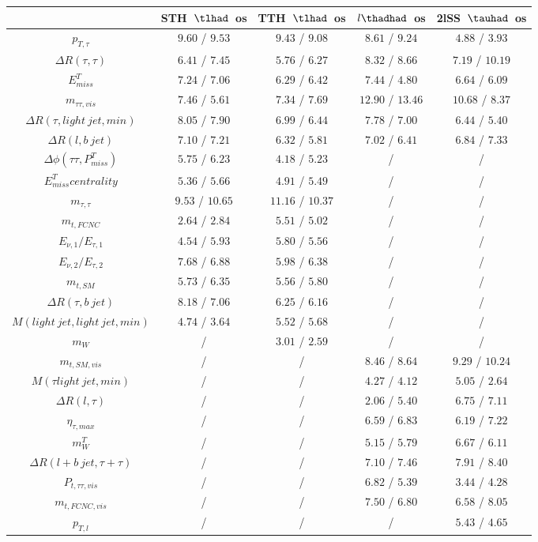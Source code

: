 \centering
\begin{tabular}{|c|c|c|c|c|} \hline
 & STH~$\tlhad$~os & TTH~$\tlhad$~os & $l\thadhad$~os & 2lSS~$\tauhad$~os\\\hline
$p_{T,\tau }$ & $9.60$ / $9.53$ & $9.43$ / $9.08$ & $8.61$ / $9.24$ & $4.88$ / $3.93$\\\hline
$\Delta R(\tau ,\tau )$ & $6.41$ / $7.45$ & $5.76$ / $6.27$ & $8.32$ / $8.66$ & $7.19$ / $10.19$\\\hline
$E^{T}_{miss}$ & $7.24$ / $7.06$ & $6.29$ / $6.42$ & $7.44$ / $4.80$ & $6.64$ / $6.09$\\\hline
$m_{\tau \tau ,vis}$ & $7.46$ / $5.61$ & $7.34$ / $7.69$ & $12.90$ / $13.46$ & $10.68$ / $8.37$\\\hline
$\Delta R(\tau ,light~jet,min)$ & $8.05$ / $7.90$ & $6.99$ / $6.44$ & $7.78$ / $7.00$ & $6.44$ / $5.40$\\\hline
$\Delta R(l,b~jet)$ & $7.10$ / $7.21$ & $6.32$ / $5.81$ & $7.02$ / $6.41$ & $6.84$ / $7.33$\\\hline
$\Delta\phi(\tau \tau ,P^{T}_{miss})$ & $5.75$ / $6.23$ & $4.18$ / $5.23$ &  / &  /\\\hline
$E^{T}_{miss} centrality$ & $5.36$ / $5.66$ & $4.91$ / $5.49$ &  / &  /\\\hline
$m_{\tau ,\tau }$ & $9.53$ / $10.65$ & $11.16$ / $10.37$ &  / &  /\\\hline
$m_{t,FCNC}$ & $2.64$ / $2.84$ & $5.51$ / $5.02$ &  / &  /\\\hline
$E_{\nu,1}/E_{\tau ,1}$ & $4.54$ / $5.93$ & $5.80$ / $5.56$ &  / &  /\\\hline
$E_{\nu,2}/E_{\tau ,2}$ & $7.68$ / $6.88$ & $5.98$ / $6.38$ &  / &  /\\\hline
$m_{t,SM}$ & $5.73$ / $6.35$ & $5.56$ / $5.80$ &  / &  /\\\hline
$\Delta R(\tau ,b~jet)$ & $8.18$ / $7.06$ & $6.25$ / $6.16$ &  / &  /\\\hline
$M(light~jet,light~jet,min)$ & $4.74$ / $3.64$ & $5.52$ / $5.68$ &  / &  /\\\hline
$m_{W}$ &  / & $3.01$ / $2.59$ &  / &  /\\\hline
$m_{t,SM,vis}$ &  / &  / & $8.46$ / $8.64$ & $9.29$ / $10.24$\\\hline
$M(\tau  light~jet,min)$ &  / &  / & $4.27$ / $4.12$ & $5.05$ / $2.64$\\\hline
$\Delta R(l,\tau )$ &  / &  / & $2.06$ / $5.40$ & $6.75$ / $7.11$\\\hline
$\eta_{\tau ,max}$ &  / &  / & $6.59$ / $6.83$ & $6.19$ / $7.22$\\\hline
$m^{T}_{W}$ &  / &  / & $5.15$ / $5.79$ & $6.67$ / $6.11$\\\hline
$\Delta R(l+b~jet,\tau +\tau )$ &  / &  / & $7.10$ / $7.46$ & $7.91$ / $8.40$\\\hline
$P_{t,\tau \tau ,vis}$ &  / &  / & $6.82$ / $5.39$ & $3.44$ / $4.28$\\\hline
$m_{t,FCNC,vis}$ &  / &  / & $7.50$ / $6.80$ & $6.58$ / $8.05$\\\hline
$p_{T,l}$ &  / &  / &  / & $5.43$ / $4.65$\\\hline
\end{tabular}
